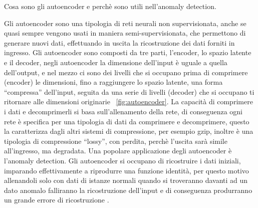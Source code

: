 

Cosa sono gli autoencoder e perchè sono utili nell'anomaly detection.

Gli autoencoder sono una tipologia di reti neurali non supervisionata, anche se quasi sempre vengono usati in maniera semi-supervisionata, che permettono di generare nuovi dati, effettuando in uscita la ricostruzione dei dati forniti in ingresso.
Gli autoencoder sono composti da tre parti, l'encoder, lo spazio latente e il decoder, negli autoencoder la dimensione dell'input è uguale a quella dell'output, e nel mezzo ci sono dei livelli che si occupano prima di comprimere (encoder) le dimensioni, fino a raggiungere lo spazio latente, una forma ``compressa'' dell'input, seguita da una serie di livelli (decoder) che si occupano ti ritornare alle dimensioni originarie ~\ref{fig:autoencoder}.
La capacità di comprimere i dati e decomprimerli si basa sull'allenamento della rete, di conseguenza ogni rete è specifica per una tipologia di dati da comprimere e decomprimere, questo la caratterizza dagli altri sistemi di compressione, per esempio gzip, inoltre è una tipologia di compressione ``lossy'', con perdita, perchè l'uscita sarà simile all'ingresso, ma degradata.
Una popolare applicazione degli autoencoder è l'anomaly detection. Gli autoencoder si occupano di ricostruire i dati iniziali, imparando effettivamente a riprodurre una funzione identità, per questo motivo allenandoli solo con dati di istanze normali quando si troveranno davanti ad un dato anomalo falliranno la ricostruzione dell'input e di conseguenza produrranno un grande errore di ricostruzione \cite{anomaly_detection_survey_2_deep_learning}. 

